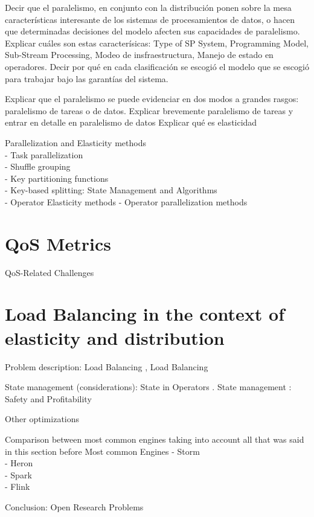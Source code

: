   Decir que el paralelismo, en conjunto con la distribución ponen sobre la mesa características interesante de los sistemas de procesamientos de datos, o hacen que determinadas decisiones del modelo afecten sus capacidades de paralelismo. Explicar cuáles son estas caracterísicas: Type of SP System, Programming Model, Sub-Stream Processing, Modeo de insfraestructura, Manejo de estado en operadores. \cite{R_ger_2019} Decir por qué en cada clasificación se escogió el modelo que se escogió para trabajar bajo las garantías del sistema.

  Explicar que el paralelismo se puede evidenciar en dos modos a grandes rasgos: paralelismo de tareas o de datos. Explicar brevemente paralelismo de tareas y entrar en detalle en paralelismo de datos
  Explicar qué es elasticidad

  Parallelization and Elasticity methods \cite{R_ger_2019}\\
  - Task parallelization \cite{R_ger_2019}\\
  - Shuffle grouping \cite{R_ger_2019}\\
  - Key partitioning functions \cite{R_ger_2019}\\
  - Key-based splitting: State Management and Algorithms \cite{R_ger_2019}\\
  - Operator Elasticity methods \cite{R_ger_2019}
  - Operator parallelization methods \cite{R_ger_2019}


  \section{QoS Metrics}
  QoS-Related Challenges\cite{chakravarthy2009stream}
  \section{Load Balancing in the context of elasticity and distribution}

  Problem description: Load Balancing  \cite{Hirzel_2014},   Load Balancing \cite{R_ger_2019}

  State management (considerations): State in Operators \cite{R_ger_2019}. State management \cite{R_ger_2019}: Safety and Profitability \cite{Schneider_2013}\cite{R_ger_2019}

  Other optimizations

  Comparison between most common engines taking into account all that was said in this section before
  Most common Engines  \cite{kamburugamuve2013survey}
  - Storm  \cite{kamburugamuve2013survey} \cite{R_ger_2019}\\
  - Heron \cite{R_ger_2019}\\
  - Spark \cite{R_ger_2019}\\
  - Flink \cite{R_ger_2019}

  Conclusion: Open Research Problems \cite{Schneider_2013}

